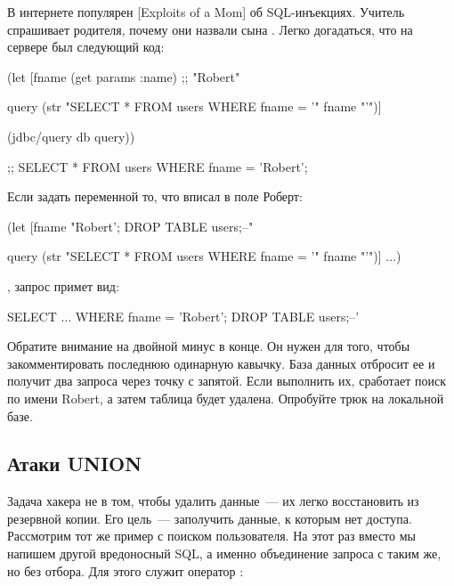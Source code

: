 \def\urlxkcdsql{https://xkcd.com/327/}

В интернете популярен \footurl{комикс Xkcd}{\urlxkcdsql}[Exploits of a Mom] об SQL-инъекциях. Учитель спрашивает родителя, почему они назвали сына . Легко догадаться, что на сервере был следующий код:

\begin{english}
  \begin{clojure}
(let [fname
      (get params :name) ;; "Robert"

      query
      (str "SELECT * FROM users WHERE fname = '"
           fname
           "'")]

  (jdbc/query db query))

;; SELECT * FROM users WHERE fname = 'Robert';
  \end{clojure}
\end{english}

Если задать переменной  то, что вписал в поле Роберт:

\begin{english}
  \begin{clojure}
(let [fname
      "Robert'; DROP TABLE users;--"

      query
      (str "SELECT * FROM users WHERE fname = '"
           fname
           "'")]
  ...)
  \end{clojure}
\end{english}

\noindent
, запрос примет вид:

\begin{english}
  \begin{sql}
SELECT ... WHERE fname = 'Robert'; DROP TABLE users;--'
  \end{sql}
\end{english}

Обратите внимание на двойной минус в конце. Он нужен для того, чтобы закомментировать последнюю одинарную кавычку. База данных отбросит ее и получит два запроса через точку с запятой. Если выполнить их, сработает поиск по имени Robert, а затем таблица  будет удалена. Опробуйте трюк на локальной базе.

\subsection{Атаки UNION}

Задача хакера не в том, чтобы удалить данные~--- их легко восстановить из резервной копии. Его цель~--- заполучить данные, к которым нет доступа. Рассмотрим тот же пример с поиском пользователя. На этот раз вместо  мы напишем другой вредоносный SQL, а именно объединение запроса с таким же, но без отбора. Для этого служит оператор :

